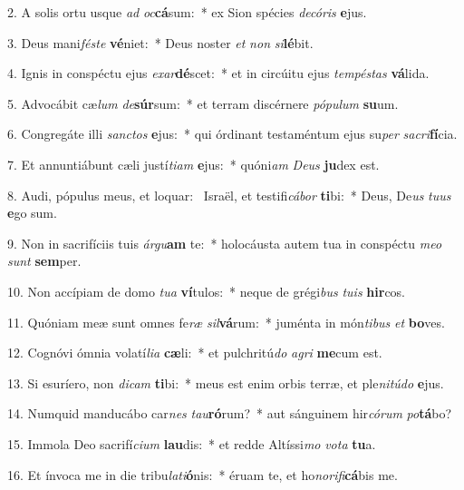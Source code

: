 2. A solis ortu usque \textit{ad} \textit{oc}\textbf{cá}sum:~*  ex Sion spécies \textit{de}\textit{có}\textit{ris} \textbf{e}jus.\

3. Deus mani\textit{fés}\textit{te} \textbf{vé}niet:~*  Deus noster \textit{et} \textit{non} \textit{si}\textbf{lé}bit.\

4. Ignis in conspéctu ejus \textit{ex}\textit{ar}\textbf{dé}scet:~*  et in circúitu ejus \textit{tem}\textit{pés}\textit{tas} \textbf{vá}lida.\

5. Advocábit cæ\textit{lum} \textit{de}\textbf{súr}sum:~*  et terram discérnere \textit{pó}\textit{pu}\textit{lum} \textbf{su}um.\

6. Congregáte illi \textit{sanc}\textit{tos} \textbf{e}jus:~*  qui órdinant testaméntum ejus su\textit{per} \textit{sa}\textit{cri}\textbf{fí}cia.\

7. Et annuntiábunt cæli justí\textit{ti}\textit{am} \textbf{e}jus:~*  quóni\textit{am} \textit{De}\textit{us} \textbf{ju}dex est.\

8. Audi, pópulus meus, et loquar: \dag\  Israël, et testifi\textit{cá}\textit{bor} \textbf{ti}bi:~*  Deus, De\textit{us} \textit{tu}\textit{us} \textbf{e}go sum.\

9. Non in sacrifíciis tuis \textit{ár}\textit{gu}\textbf{am} te:~*  holocáusta autem tua in conspéctu \textit{me}\textit{o} \textit{sunt} \textbf{sem}per.\

10. Non accípiam de domo \textit{tu}\textit{a} \textbf{ví}tulos:~*  neque de grégi\textit{bus} \textit{tu}\textit{is} \textbf{hir}cos.\

11. Quóniam meæ sunt omnes fe\textit{ræ} \textit{sil}\textbf{vá}rum:~*  juménta in món\textit{ti}\textit{bus} \textit{et} \textbf{bo}ves.\

12. Cognóvi ómnia volatí\textit{li}\textit{a} \textbf{cæ}li:~*  et pulchritú\textit{do} \textit{a}\textit{gri} \textbf{me}cum est.\

13. Si esuríero, non \textit{di}\textit{cam} \textbf{ti}bi:~*  meus est enim orbis terræ, et ple\textit{ni}\textit{tú}\textit{do} \textbf{e}jus.\

14. Numquid manducábo car\textit{nes} \textit{tau}\textbf{ró}rum?~*  aut sánguinem hir\textit{có}\textit{rum} \textit{po}\textbf{tá}bo?\

15. Immola Deo sacrifí\textit{ci}\textit{um} \textbf{lau}dis:~*  et redde Altíssi\textit{mo} \textit{vo}\textit{ta} \textbf{tu}a.\

16. Et ínvoca me in die tribu\textit{la}\textit{ti}\textbf{ó}nis:~*  éruam te, et ho\textit{no}\textit{ri}\textit{fi}\textbf{cá}bis me.\


